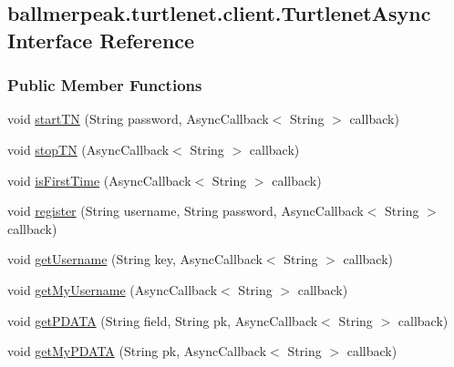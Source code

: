 \hypertarget{interfaceballmerpeak_1_1turtlenet_1_1client_1_1TurtlenetAsync}{\subsection{ballmerpeak.\-turtlenet.\-client.\-Turtlenet\-Async Interface Reference}
\label{interfaceballmerpeak_1_1turtlenet_1_1client_1_1TurtlenetAsync}
}
\subsubsection*{Public Member Functions}
\begin{DoxyCompactItemize}
\item 
void \hyperlink{interfaceballmerpeak_1_1turtlenet_1_1client_1_1TurtlenetAsync_a7e875c3b32ebacefaffa6ebd69aa2f44}{start\-T\-N} (String password, Async\-Callback$<$ String $>$ callback)
\item 
void \hyperlink{interfaceballmerpeak_1_1turtlenet_1_1client_1_1TurtlenetAsync_a70baaa36490a38c7e74cd9f57358336e}{stop\-T\-N} (Async\-Callback$<$ String $>$ callback)
\item 
void \hyperlink{interfaceballmerpeak_1_1turtlenet_1_1client_1_1TurtlenetAsync_ab4af3d58c26899d68d862bd720624a89}{is\-First\-Time} (Async\-Callback$<$ String $>$ callback)
\item 
void \hyperlink{interfaceballmerpeak_1_1turtlenet_1_1client_1_1TurtlenetAsync_a9190e36e28740c7d668894192b7f2426}{register} (String username, String password, Async\-Callback$<$ String $>$ callback)
\item 
void \hyperlink{interfaceballmerpeak_1_1turtlenet_1_1client_1_1TurtlenetAsync_a95d3fddff52812d79a984b9ef91c80ef}{get\-Username} (String key, Async\-Callback$<$ String $>$ callback)
\item 
void \hyperlink{interfaceballmerpeak_1_1turtlenet_1_1client_1_1TurtlenetAsync_a07b7f0d56105f4fc945a854a9a316e1e}{get\-My\-Username} (Async\-Callback$<$ String $>$ callback)
\item 
void \hyperlink{interfaceballmerpeak_1_1turtlenet_1_1client_1_1TurtlenetAsync_a2c1ffad266ffba1ced9024011b85ef80}{get\-P\-D\-A\-T\-A} (String field, String pk, Async\-Callback$<$ String $>$ callback)
\item 
void \hyperlink{interfaceballmerpeak_1_1turtlenet_1_1client_1_1TurtlenetAsync_acdbee21a3c9f37b2454fa81c6f81afe7}{get\-My\-P\-D\-A\-T\-A} (String pk, Async\-Callback$<$ String $>$ callback)

\end{DoxyCompactItemize}
